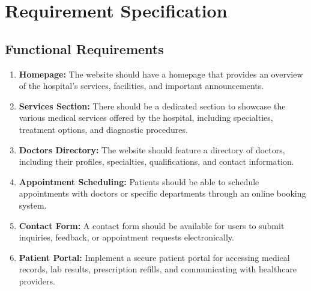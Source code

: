 \documentclass{article}
\begin{document}
\clearpage

\section{Requirement Specification} \label{sec:requirement_specification}
\subsection{Functional Requirements}
\begin{enumerate}
    \item \textbf{Homepage:} The website should have a homepage that provides an overview of the hospital's services, facilities, and important announcements.
    \item \textbf{Services Section:} There should be a dedicated section to showcase the various medical services offered by the hospital, including specialties, treatment options, and diagnostic procedures.
    \item \textbf{Doctors Directory:} The website should feature a directory of doctors, including their profiles, specialties, qualifications, and contact information.
    \item \textbf{Appointment Scheduling:} Patients should be able to schedule appointments with doctors or specific departments through an online booking system.
    \item \textbf{Contact Form:} A contact form should be available for users to submit inquiries, feedback, or appointment requests electronically.
    \item \textbf{Patient Portal:} Implement a secure patient portal for accessing medical records, lab results, prescription refills, and communicating with healthcare providers.
\end{enumerate}
\end{document}
